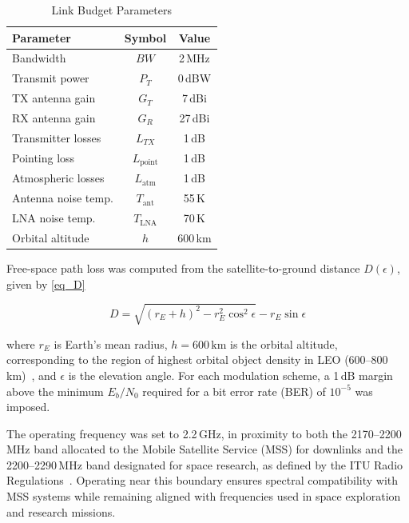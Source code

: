 \begin{table}[b]
    \caption{Link Budget Parameters}
    \label{tab:link_budget_params}
    \centering
    \renewcommand{\arraystretch}{1.15}
    \begin{tabular}{lcc}
        \hline\hline
        \textbf{Parameter} & \textbf{Symbol} & \textbf{Value} \\
        \hline
        Bandwidth               & $BW$               & 2\,MHz   \\
        Transmit power          & $P_T$              & 0\,dBW   \\
        TX antenna gain         & $G_T$              & 7\,dBi   \\
        RX antenna gain         & $G_R$              & 27\,dBi  \\
        Transmitter losses      & $L_{TX}$           & 1\,dB    \\
        Pointing loss           & $L_\text{point}$   & 1\,dB    \\
        Atmospheric losses      & $L_\text{atm}$     & 1\,dB    \\
        Antenna noise temp.     & $T_\text{ant}$     & 55\,K    \\
        LNA noise temp.         & $T_\text{LNA}$     & 70\,K    \\
        Orbital altitude        & $h$                & 600\,km  \\
        \hline\hline
    \end{tabular}
\end{table}

Free-space path loss was computed from the satellite-to-ground distance $D(\epsilon)$, given by \eqref{eq_D}

\begin{equation}
    D = \sqrt{(r_E + h)^2 - r_E^2 \cos^2{\epsilon}} - r_E \sin{\epsilon}
    \label{eq_D}
\end{equation}

where $r_E$ is Earth's mean radius, $h = 600\,\text{km}$ is the orbital altitude, corresponding to the region of highest orbital object density in LEO (600--800\,km)~\cite[Sec.~1.3.1]{AnzMeador2018}, and $\epsilon$ is the elevation angle. For each modulation scheme, a 1\,dB margin above the minimum $E_b/N_0$ required for a bit error rate (BER) of $10^{-5}$ was imposed.

The operating frequency was set to 2.2\,GHz, in proximity to both the 2170--2200\,MHz band allocated to the Mobile Satellite Service (MSS) for downlinks and the 2200--2290\,MHz band designated for space research, as defined by the ITU Radio Regulations~\cite{ITU_RR2024}. Operating near this boundary ensures spectral compatibility with MSS systems while remaining aligned with frequencies used in space exploration and research missions.


